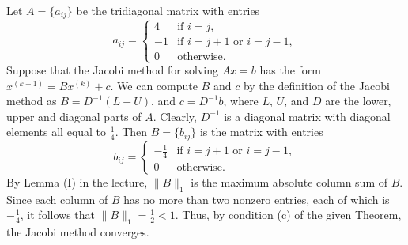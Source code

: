 \documentclass{homework}
\begin{document}
	\question
	Let $A = \{a_{ij}\}$ be the tridiagonal matrix with entries
	\begin{equation}
		a_{ij} = \begin{cases}
			4 & \text{if } i= j,\\
			-1 & \text{if } i=j+1 \text{ or } i = j-1,\\
			0 & \text{otherwise}.
		\end{cases}
	\end{equation}
	Suppose that the Jacobi method for solving $Ax = b$ has the form $x^{(k+1)} = Bx^{(k)} + c$. We can compute $B$ and $c$ by the definition of the Jacobi method as $B = D^{-1}(L+U)$, and $c = D^{-1}b$, where $L$, $U$, and $D$ are the lower, upper and diagonal parts of $A$. Clearly, $D^{-1}$ is a diagonal matrix with diagonal elements all equal to $\frac{1}{4}$. Then $B = \{b_{ij}\}$ is the matrix with entries
	\begin{equation}
		b_{ij} = \begin{cases}
			-\frac{1}{4} & \text{if } i=j+1\text{ or }i = j-1,\\
			0 & \text{otherwise}.
		\end{cases}
	\end{equation}
	By Lemma (I) in the lecture, $\lVert B \rVert_1$ is the maximum absolute column sum of $B$. Since each column of $B$ has no more than two nonzero entries, each of which is $-\frac{1}{4}$, it follows that $\lVert B \rVert_1 = \frac{1}{2} < 1$. Thus, by condition (c) of the given Theorem, the Jacobi method converges.
	
\end{document}
